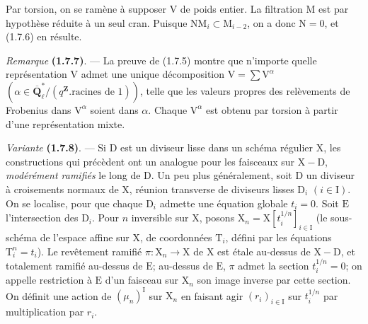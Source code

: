 \documentclass[11pt,leqno]{article}
\begin{document}
Par torsion, on se ramène à supposer \(\mathrm{V}\) de poids entier. La filtration \(\mathrm{M}\) est par hypothèse réduite à un seul cran. Puisque \(\mathrm{N}\mathrm{M}_i\subset\mathrm{M}_{i-2}\), on a donc \(\mathrm{N}=0\), et (1.7.6) en résulte.

\textit{Remarque} \textbf{(1.7.7)}. — La preuve de (1.7.5) montre que n’importe quelle représentation \(\mathrm{V}\) admet une unique décomposition \(\mathrm{V}=\sum\mathrm{V}^{\alpha}\) \((\alpha\in\overline{\mathbf{Q}}_\ell^*/(q^{\mathbf{Z}}.\text{racines de }1))\), telle que les valeurs propres des relèvements de Frobenius dans \(\mathrm{V}^{\alpha}\) soient dans \(\alpha\). Chaque \(\mathrm{V}^{\alpha}\) est obtenu par torsion à partir d’une représentation mixte.

\textit{Variante} \textbf{(1.7.8)}. — Si \(\mathrm{D}\) est un diviseur lisse dans un schéma régulier \(\mathrm{X}\), les constructions qui précèdent ont un analogue pour les faisceaux sur \(\mathrm{X}-\mathrm{D}\), \textit{modérément ramifiés} le long de \(\mathrm{D}\). Un peu plus généralement, soit \(\mathrm{D}\) un diviseur à croisements normaux de \(\mathrm{X}\), réunion transverse de diviseurs lisses \(\mathrm{D}_i\) \((i\in\mathrm{I})\). On se localise, pour que chaque \(\mathrm{D}_i\) admette une équation globale \(t_i=0\). Soit \(\mathrm{E}\) l’intersection des \(\mathrm{D}_i\). Pour \(n\) inversible sur \(\mathrm{X}\), posons \(\mathrm{X}_n=\mathrm{X}[t_i^{1/n}]_{i\in\mathrm{I}}\) (le sous-schéma de l’espace affine sur \(\mathrm{X}\), de coordonnées \(\mathrm{T}_i\), défini par les équations \(\mathrm{T}_i^n=t_i\)). Le revêtement ramifié \(\pi:\mathrm{X}_n\to\mathrm{X}\) de \(\mathrm{X}\) est étale au-dessus de \(\mathrm{X}-\mathrm{D}\), et totalement ramifié au-dessus de \(\mathrm{E}\); au-dessus de \(\mathrm{E}\), \(\pi\) admet la section \(t_i^{1/n}=0\); on appelle restriction à \(\mathrm{E}\) d’un faisceau sur \(\mathrm{X}_n\) son image inverse par cette section. On définit une action de \((\mu_n)^{\mathrm{I}}\) sur \(\mathrm{X}_n\) en faisant agir \((r_i)_{i\in\mathrm{I}}\) sur \(t_i^{1/n}\) par multiplication par \(r_i\).
\end{document}
